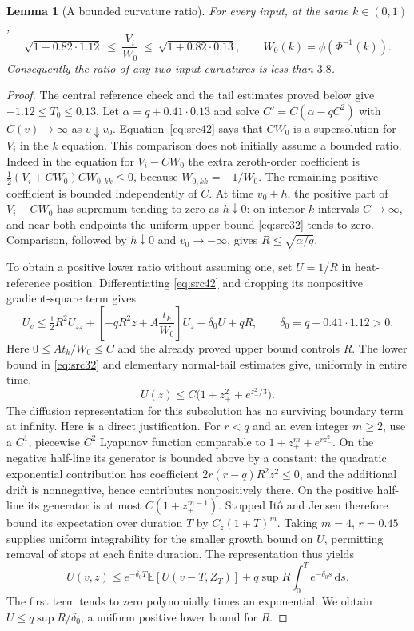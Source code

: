 \documentclass[11pt,a4paper]{article}
\numberwithin{equation}{section}
\newtheorem{lemma}[theorem]{Lemma}
\theoremstyle{definition}
\theoremstyle{remark}
\newcommand{\E}{\mathbb E}
\newcommand{\dd}{\mathrm d}
\begin{document}
\begin{lemma}[A bounded curvature ratio]
\label{lem:contr-heat-ratio}
For every input, at the same $k\in(0,1)$,
\begin{equation}
 \sqrt{1-0.82\cdot1.12}
 \ \le\ \frac{V_i}{W_0}
 \ \le\ \sqrt{1+0.82\cdot0.13},
 \qquad W_0(k)=\phi(\Phi^{-1}(k)).
 \label{eq:src43}
\end{equation}
Consequently the ratio of any two input curvatures is less than $3.8$.
\end{lemma}

\begin{proof}
The central reference check and the tail estimates proved below give
$-1.12\le T_0\le0.13$.  Let
$\alpha=q+0.41\cdot0.13$ and solve
$C'=C(\alpha-qC^2)$ with $C(v)\to\infty$ as $v\downarrow v_0$.
Equation~\eqref{eq:src42} says that $CW_0$ is a supersolution for
$V_i$ in the $k$ equation.  This comparison does not initially assume
a bounded ratio.  Indeed in the equation for $V_i-CW_0$ the extra
zeroth-order coefficient is
$\tfrac12(V_i+CW_0)CW_{0,kk}\le0$, because $W_{0,kk}=-1/W_0$.
The remaining positive coefficient is bounded independently of $C$.
At time $v_0+h$, the positive part of $V_i-CW_0$ has supremum tending
to zero as $h\downarrow0$: on interior $k$-intervals $C\to\infty$,
and near both endpoints the uniform upper bound
\eqref{eq:src32} tends to zero.  Comparison, followed by
$h\downarrow0$ and $v_0\to-\infty$, gives
$R\le\sqrt{\alpha/q}$.

To obtain a positive lower ratio without assuming one, set $U=1/R$
in heat-reference position.  Differentiating \eqref{eq:src42} and
dropping its nonpositive gradient-square term gives
\[
 U_v\le\tfrac12R^2U_{zz}
       +\left[-qR^2z+A\frac{t_k}{W_0}\right]U_z
       -\delta_0U+qR,
 \qquad \delta_0=q-0.41\cdot1.12>0.
\]
Here $0\le At_k/W_0\le C$ and the already proved upper bound controls
$R$.  The lower bound in \eqref{eq:src32} and elementary normal-tail
estimates give, uniformly in entire time,
\[
 U(z)\le C\bigl(1+z_+^2+e^{z_-^2/3}\bigr).
\]
The diffusion representation for this subsolution has no surviving
boundary term at infinity.  Here is a direct justification.  For
$r<q$ and an even integer $m\ge2$, use a $C^1$, piecewise $C^2$
Lyapunov function comparable to
$1+z_+^m+e^{rz_-^2}$.  On the negative half-line its generator is
bounded above by a constant: the quadratic exponential contribution
has coefficient $2r(r-q)R^2z^2\le0$, and the additional drift is
nonnegative, hence contributes nonpositively there.  On the positive
half-line its generator is at most $C(1+z_+^{m-1})$.  Stopped It\^o
and Jensen therefore bound its expectation over duration $T$ by
$C_z(1+T)^m$.  Taking $m=4$, $r=0.45$ supplies uniform integrability
for the smaller growth bound on $U$, permitting removal of stops at
each finite duration.  The representation thus yields
\[
 U(v,z)\le e^{-\delta_0T}\E[U(v-T,Z_T)]
       +q\sup R\int_0^T e^{-\delta_0s}\,\dd s.
\]
The first term tends to zero polynomially times an exponential.  We
obtain $U\le q\sup R/\delta_0$, a uniform positive lower bound for
$R$.


\end{proof}
\end{document}
